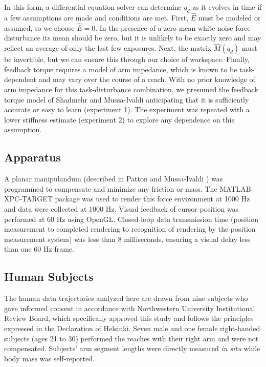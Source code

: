 \documentclass[letterpaper, 10 pt, conference]{ieeeconf}  %
\begin{document}
In this form, a differential equation solver can determine $q_d$ as it evolves in time if a few assumptions are made and conditions are met. First, $\hat{E}$ must be modeled or assumed, so we choose $\hat{E}=0$. In the presence of a zero mean white noise force disturbance its mean should be zero, but it is unlikely to be exactly zero and may reflect an average of only the last few exposures\cite{scheidt2001learning}. Next, the matrix $\hat{M}(q_d)$ must be invertible, but we can ensure this through our choice of workspace. Finally, feedback torque requires a model of arm impedance, which is known to be task-dependent\cite{gomi1998task} and may vary over the course of a reach\cite{niu2010temporal}. With no prior knowledge of arm impedance for this task-disturbance combination, we presumed the feedback torque model of Shadmehr and Mussa-Ivaldi anticipating that it is sufficiently accurate or easy to learn (experiment 1). The experiment was repeated with a lower stiffness estimate (experiment 2) to explore any dependence on this assumption.

\subsection*{Apparatus}
A planar manipulandum (described in Patton and Mussa-Ivaldi \cite{patton2004robot}) was programmed to compensate and minimize any friction or mass. The MATLAB XPC-TARGET package \cite{MATLAB:2008} was used to render this force environment at 1000 Hz and data were collected at 1000 Hz.  Visual feedback of cursor position was performed at 60 Hz using OpenGL. Closed-loop data transmission time (position measurement to completed rendering to recognition of rendering by the position measurement system) was less than 8 milliseconds, ensuring a visual delay less than one 60 Hz frame.

\subsection*{Human Subjects}
The human data trajectories analyzed here are drawn from nine subjects who gave informed consent in accordance with Northwestern University Institutional Review Board, which specifically approved this study and follows the principles expressed in the Declaration of Helsinki. Seven male and one female right-handed subjects (ages 21 to 30) performed the reaches with their right arm and were not compensated. Subjects' arm segment lengths were directly measured \textit{in situ} while body mass was self-reported.
\end{document}
